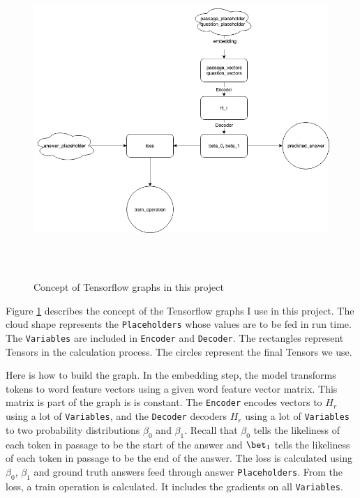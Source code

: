 \documentclass[modernstyle,12pt]{sjsuthesis}
\theoremstyle{definition}
\begin{document}
\begin{figure}[htbp]\centering
  \includegraphics[width=12cm, height=12cm]{figures/tf_graph.png}
  \caption{Concept of Tensorflow graphs in this project}
  \label{f:tf_graph}
\end{figure}

Figure \ref{f:tf_graph} describes the concept of the Tensorflow graphs I use in this project. The cloud shape represents the {\tt Placeholders} whose values are to be fed in run time. The {\tt Variables} are included in {\tt Encoder} and {\tt Decoder}. The rectangles represent Tensors in the calculation process. The circles represent the final Tensors we use.

Here is how to build the graph. In the embedding step, the model transforms tokens to word feature vectors using a given word feature vector matrix. This matrix is part of the graph is is constant. The {\tt Encoder} encodes vectors to $H_r$ using a lot of {\tt Variables}, and the {\tt Decoder} decoders $H_r$ using a lot of {\tt Variables} to two probability distributions $\beta _0$ and $\beta _1$. Recall that $\beta _0$ tells the likeliness of each token in passage to be the start of the answer and $\bet _1$ tells the likeliness of each token in passage to be the end of the answer. The loss is calculated using $\beta _0$, $\beta _1$ and ground truth answers feed through answer {\tt Placeholders}. From the loss, a train operation is calculated. It includes the gradients on all {\tt Variables}.
\end{document}
